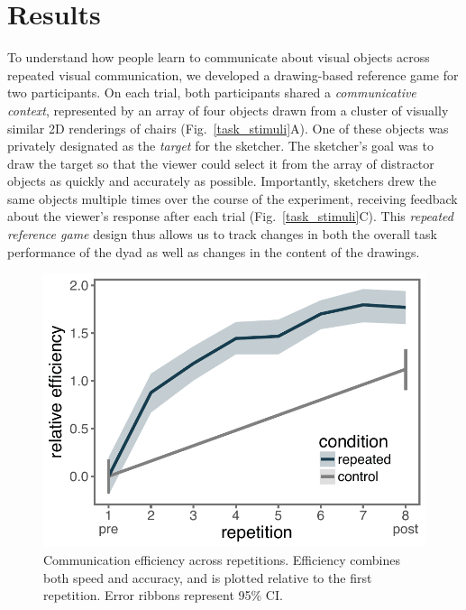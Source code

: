 \documentclass[11pt,letterpaper]{article}
\begin{document}

\section{Results}

To understand how people learn to communicate about visual objects across repeated visual communication, we developed a drawing-based reference game for two participants.
On each trial, both participants shared a \textit{communicative context}, represented by an array of four objects drawn from a cluster of visually similar 2D renderings of chairs (Fig.~\ref{task_stimuli}A).
One of these objects was privately designated as the \emph{target} for the sketcher.
The sketcher's goal was to draw the target so that the viewer could select it from the array of distractor objects as quickly and accurately as possible.
Importantly, sketchers drew the same objects multiple times over the course of the experiment, receiving feedback about the viewer's response after each trial  (Fig.~\ref{task_stimuli}C).
This \emph{repeated reference game} design thus allows us to track changes in both the overall task performance of the dyad as well as changes in the content of the drawings.

\begin{figure}
\begin{center}
\includegraphics[width=0.5\linewidth]{figures/refgame_BIS_timeseries.pdf}
\caption{Communication efficiency across repetitions. Efficiency combines both speed and accuracy, and is plotted relative to the first repetition. Error ribbons represent 95\% CI.}
\label{refgame_bis}
\end{center}
\end{figure}
\end{document}

